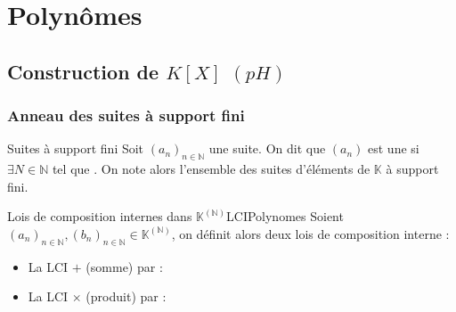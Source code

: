 \documentclass[12pt,a4paper]{report}
\begin{document}
\chapter{Polynômes}

\section{Construction de $K[X]$ $(pH)$}

    \subsection{Anneau des suites à support fini}

    \begin{definition}{Suites à support fini}{}
    Soit $(a_n)_{n \in \mathbb{N}}$ une suite. On dit que $(a_n)$ est une  si $\exists N \in \mathbb{N}$ tel que . On note alors  l'ensemble des suites d'éléments de $\mathbb{K}$ à support fini.
    \end{definition}
    
    \begin{proposition}{Lois de composition internes dans $\mathbb{K}^{(\mathbb{N})}$}{LCIPolynomes}
    Soient $(a_n)_{n \in \mathbb{N}}, (b_n)_{n \in \mathbb{N}} \in \mathbb{K}^{(\mathbb{N})}$, on définit alors deux lois de composition interne :
    \begin{itemize}
        \item La LCI $+$ (somme) par : 
        \item La LCI $\times$ (produit) par : 
    \end{itemize}
    \end{proposition}
    
\end{document}

